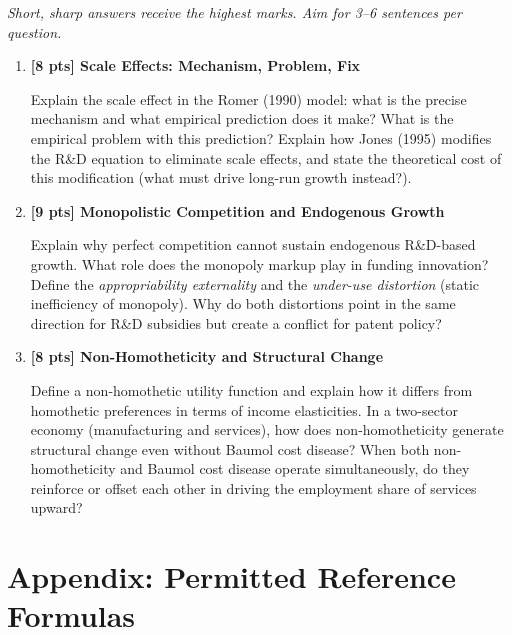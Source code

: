 \documentclass[a4paper,11pt]{article}
\begin{document}
\textit{Short, sharp answers receive the highest marks. Aim for 3--6 sentences per question.}

\bigskip

\begin{enumerate}[label=\textbf{SQ\arabic*.},leftmargin=*]

\item \textbf{[8 pts] Scale Effects: Mechanism, Problem, Fix}

Explain the scale effect in the Romer (1990) model: what is the precise mechanism and what empirical prediction does it make? What is the empirical problem with this prediction? Explain how Jones (1995) modifies the R\&D equation to eliminate scale effects, and state the theoretical cost of this modification (what must drive long-run growth instead?).

\bigskip

\item \textbf{[9 pts] Monopolistic Competition and Endogenous Growth}

Explain why perfect competition cannot sustain endogenous R\&D-based growth. What role does the monopoly markup play in funding innovation? Define the \emph{appropriability externality} and the \emph{under-use distortion} (static inefficiency of monopoly). Why do both distortions point in the same direction for R\&D subsidies but create a conflict for patent policy?

\bigskip

\item \textbf{[8 pts] Non-Homotheticity and Structural Change}

Define a non-homothetic utility function and explain how it differs from homothetic preferences in terms of income elasticities. In a two-sector economy (manufacturing and services), how does non-homotheticity generate structural change even without Baumol cost disease? When both non-homotheticity and Baumol cost disease operate simultaneously, do they reinforce or offset each other in driving the employment share of services upward?

\end{enumerate}

\clearpage

\appendix
\section*{Appendix: Permitted Reference Formulas}
\end{document}
